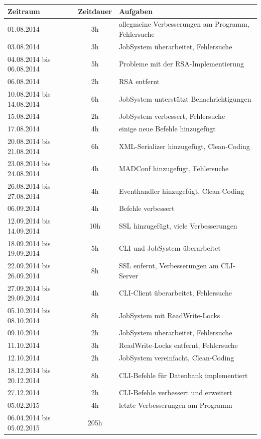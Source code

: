 \documentclass[12pt,a4paper]{report}
\begin{document}
\begin{onehalfspace}
\begin{center}
\begin{tabular}{|l|c|l|}
\end{tabular}
\end{center}

\newpage

\begin{center}
\begin{tabular}{|l|c|l|}

\hline
\textbf{Zeitraum} & \textbf{Zeitdauer} & \textbf{Aufgaben} \\ \hline
01.08.2014 & 3h & allegmeine Verbesserungen am Programm, Fehlersuche\\
03.08.2014 & 3h & JobSystem überarbeitet, Fehlersuche\\
04.08.2014 bis 06.08.2014 & 5h & Probleme mit der RSA-Implementierung\\
06.08.2014 & 2h & RSA entfernt\\
10.08.2014 bis 14.08.2014 & 6h & JobSystem unterstützt Benachrichtigungen\\
15.08.2014 & 2h & JobSystem verbessert, Fehlersuche\\
17.08.2014 & 4h & einige neue Befehle hinzugefügt\\
20.08.2014 bis 21.08.2014 & 6h & XML-Serializer hinzugefügt, Clean-Coding\\
23.08.2014 bis 24.08.2014 & 4h & MADConf hinzugefügt, Fehlersuche\\
26.08.2014 bis 27.08.2014 & 4h & Eventhandler hinzugefügt, Clean-Coding\\
06.09.2014 & 4h & Befehle verbessert\\
12.09.2014 bis 14.09.2014 & 10h & SSL hinzugefügt, viele Verbesserungen\\
18.09.2014 bis 19.09.2014 & 5h & CLI und JobSystem überarbeitet\\
22.09.2014 bis 26.09.2014 & 8h & SSL enfernt, Verbesserungen am CLI-Server\\
27.09.2014 bis 29.09.2014 & 4h & CLI-Client überarbeitet, Fehlersuche\\
05.10.2014 bis 08.10.2014 & 8h & JobSystem mit ReadWrite-Locks\\
09.10.2014 & 2h & JobSystem überarbeitet, Fehlersuche\\
11.10.2014 & 3h & ReadWrite-Locks entfernt, Fehlersuche\\
12.10.2014 & 2h & JobSystem vereinfacht, Clean-Coding\\
18.12.2014 bis 20.12.2014 & 8h &CLI-Befehle für Datenbank implementiert\\
27.12.2014 & 2h & CLI-Befehle verbessert und erweitert\\
05.02.2015 & 4h &letzte Verbesserungen am Programm\\
 \hline \hline
06.04.2014 bis 05.02.2015 &205h&\\ \hline


\end{tabular}
\end{center}
\end{onehalfspace}
\end{document}

